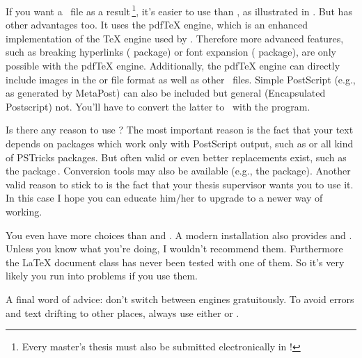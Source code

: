If you want a \PDF\ file as a result\,\footnote{Every master's thesis must
  also be submitted electronically in \PDF!}, it's easier to use
 than , as illustrated in .
But  has other advantages too. It uses the pdfTeX engine,
which is an enhanced implementation of the TeX engine used by .
Therefore more advanced features, such as breaking hyperlinks
( package) or font expansion ( package), are
only possible with the pdfTeX engine. Additionally, the pdfTeX engine can
directly include images in the  or  file format as
well as other \PDF\ files. Simple PostScript (e.g., as generated by
MetaPost) can also be included but general  (Encapsulated
Postscript) not. You'll have to convert the latter to \PDF\ with the
 program.

Is there any reason to use ? The most important reason is the
fact that your text depends on packages which work only with PostScript
output, such as  or all kind of PSTricks packages. But often
valid or even better replacements exist, such as the 
package\,\cite{pkg:pgf}. Conversion tools may also be available (e.g., the
 package).
Another valid reason to stick to  is the fact that your
thesis supervisor wants you to use it. In this case I hope you can educate
him/her to upgrade to a newer way of working.

You even have more choices than  and . A modern
installation also provides  and . Unless you
know what you're doing, I wouldn't recommend them. Furthermore the LaTeX
document class  has never been tested with one of them. So it's
very likely you run into problems if you use them.

A final word of advice: don't switch between engines gratuitously. To avoid
errors and text drifting to other places, always use either  or
.


